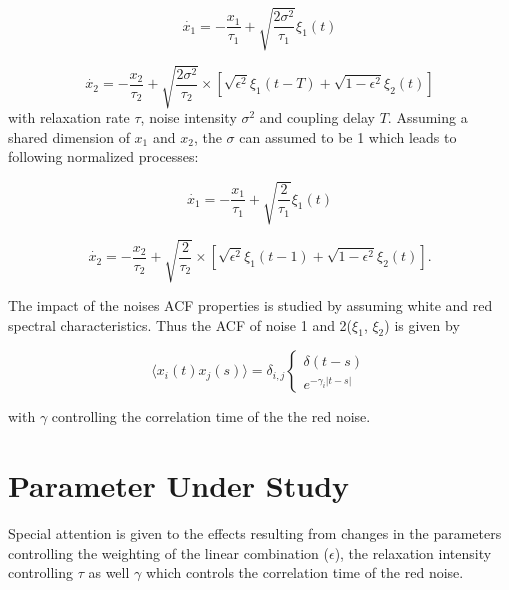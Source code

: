 \documentclass[a4paper,12pt]{book}
\theoremstyle{break}
\begin{document}
\begin{equation}\label{m/ou1}
	\dot{x_1}=-\frac{x_1}{\tau_1} + \sqrt{\frac{2\sigma^2}{\tau_1}}\xi_1(t)
\end{equation}

\begin{equation}\label{m/ou2}
	\dot{x_2}=-\frac{x_2}{\tau_2} + \sqrt{\frac{2\sigma^2}{\tau_2}}\times[\sqrt{\epsilon^2}\xi_1(t - T) + \sqrt{1-\epsilon^2} \xi_2(t)]
\end{equation}
with relaxation rate $\tau$, noise intensity $\sigma^2$ and coupling delay $T$.
Assuming a shared dimension of $x_1$ and $x_2$, the $\sigma$ can assumed to be 1 which leads to following normalized processes:

\begin{equation}\label{m/ou1n}
\dot{x_1}=-\frac{x_1}{\tau_1} + \sqrt{\frac{2}{\tau_1}}\xi_1(t)
\end{equation}

\begin{equation}\label{m/ou2n}
\dot{x_2}=-\frac{x_2}{\tau_2} + \sqrt{\frac{2}{\tau_2}}\times[\sqrt{\epsilon^2}\xi_1(t - 1) + \sqrt{1-\epsilon^2} \xi_2(t)].
\end{equation}

The impact of the noises \ac{ACF} properties is studied by assuming white and red spectral characteristics. Thus the \ac{ACF} of noise 1 and 2($\xi_1$, $\xi_2$) is given by

\begin{equation}
	\langle x_i(t)x_j(s)\rangle = \delta_{i,j}
	\begin{cases} 
	\delta(t-s) \\
	e^{-\gamma_i |t-s|}
	\end{cases}
\end{equation}

with $\gamma$ controlling the correlation time of the the red noise.

\section{Parameter Under Study}\label{s/intro/parameter}
Special attention is given to the effects resulting from changes in the parameters controlling the weighting of the linear combination ($\epsilon$), the relaxation intensity controlling $\tau$ as well $\gamma$ which controls the correlation time of the red noise.
\end{document}
